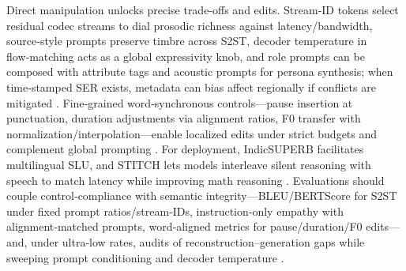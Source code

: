 \documentclass{article}
\begin{document}
Direct manipulation unlocks precise trade‑offs and edits. Stream‑ID tokens select residual codec streams to dial prosodic richness against latency/bandwidth, source‑style prompts preserve timbre across S2ST, decoder temperature in flow‑matching acts as a global expressivity knob, and role prompts can be composed with attribute tags and acoustic prompts for persona synthesis; when time‑stamped SER exists, metadata can bias affect regionally if conflicts are mitigated \cite{peng2024mslms2stmultitaskspeechlanguagemodeltext,yuan2024continuousspeechtokensmakesllmsrobustmul,wang2024blspemotowardsempatheticlargespeechlangu,wang2025incorporatingcontextualparalinguisticund}. Fine‑grained word‑synchronous controls—pause insertion at punctuation, duration adjustments via alignment ratios, F0 transfer with normalization/interpolation—enable localized edits under strict budgets and complement global prompting \cite{huang2023holisticcascadesystembenchmarkhumanevalu}. For deployment, IndicSUPERB facilitates multilingual SLU, and STITCH lets models interleave silent reasoning with speech to match latency while improving math reasoning \cite{entry2025indicsuperbspeechprocessinguniversalperf,chiang2025stitchsimultaneousthinkingtalkingchunked}. Evaluations should couple control‑compliance with semantic integrity—BLEU/BERTScore for S2ST under fixed prompt ratios/stream‑IDs, instruction‑only empathy with alignment‑matched prompts, word‑aligned metrics for pause/duration/F0 edits—and, under ultra‑low rates, audits of reconstruction–generation gaps while sweeping prompt conditioning and decoder temperature \cite{wang2024blspemotowardsempatheticlargespeechlangu,huang2023holisticcascadesystembenchmarkhumanevalu}.
\end{document}
